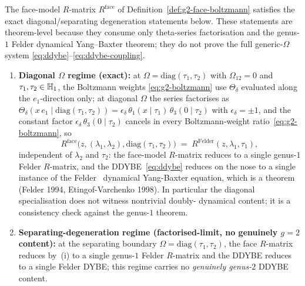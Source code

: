 \begin{theorem}
\label{thm:g2-face-model-bypass-scope-restricted}
The face-model $R$-matrix $R^{\mathrm{face}}$ of
Definition~\ref{def:g2-face-boltzmann}
satisfies the exact diagonal/separating degeneration statements
below. These statements are theorem-level because they consume only
theta-series factorisation and the genus-$1$ Felder
dynamical Yang--Baxter theorem; they do not prove the full
generic-$\Omega$ system \eqref{eq:ddybe}--\eqref{eq:ddybe-coupling}.
\begin{enumerate}[label=\textup{(\roman*)}]
\item \textbf{Diagonal $\Omega$ regime (exact):}
 at $\Omega=\mathrm{diag}(\tau_1,\tau_2)$ with
 $\Omega_{12}=0$ and $\tau_1,\tau_2\in\mathbb{H}_1$, the
 Boltzmann weights
 \eqref{eq:g2-boltzmann} use $\Theta_\delta$ evaluated along
 the $e_1$-direction only; at diagonal $\Omega$ the series
 factorises as
 $\Theta_\delta(x\,e_1\mid\mathrm{diag}(\tau_1,\tau_2))
 = \epsilon_\delta\,\theta_1(x\mid\tau_1)\,
 \theta_3(0\mid\tau_2)$
 with $\epsilon_\delta=\pm 1$, and the constant factor
 $\epsilon_\delta\,\theta_3(0\mid\tau_2)$ cancels in every
 Boltzmann-weight ratio~\eqref{eq:g2-boltzmann}, so
 \begin{equation}\label{eq:g2p-diagonal-exact}
 R^{\mathrm{face}}\bigl(z,(\lambda_1,\lambda_2),
 \mathrm{diag}(\tau_1,\tau_2)\bigr)
 \;=\;
 R^{\mathrm{Felder}}(z,\lambda_1,\tau_1),
 \end{equation}
 independent of $\lambda_2$ and $\tau_2$: the face-model
 $R$-matrix reduces to a single genus-$1$ Felder $R$-matrix,
 and the DDYBE~\eqref{eq:ddybe} reduces on the nose to a
 single instance of the Felder~\cite{Felder94} dynamical
 Yang-Baxter equation, which is a theorem
 (Felder 1994, Etingof-Varchenko 1998). In particular the
 diagonal specialisation does not witness nontrivial doubly-
 dynamical content; it is a consistency check against the
 genus-$1$ theorem.
\item \textbf{Separating-degeneration regime
 (factorised-limit, no genuinely $g=2$ content):} at the
 separating boundary $\Omega=\mathrm{diag}(\tau_1,\tau_2)$,
 the face $R$-matrix reduces by~(i) to a single genus-$1$
 Felder $R$-matrix and the DDYBE reduces to a single Felder
 DYBE; this regime carries no \emph{genuinely genus-$2$}
 DDYBE content.
\end{enumerate}
\end{theorem}

